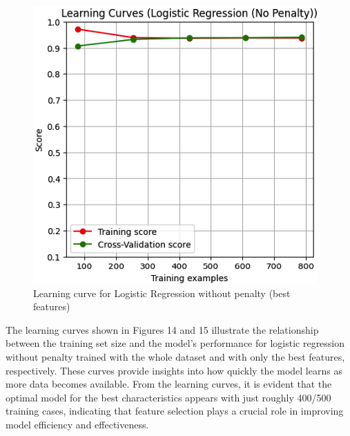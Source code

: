 \documentclass[conference]{IEEEtran}
\begin{document}
\begin{figure}[H]
    \centering
    \includegraphics[width=1\linewidth]{images/LearningCurveNoPenaltyBestFeatures.png}
    \caption{Learning curve for Logistic Regression without penalty (best features)}
    \label{fig:learning-curve-best}
\end{figure}


The learning curves shown in Figures 14 and 15 illustrate the relationship between the training set size and the model's performance for logistic regression without penalty trained with the whole dataset and with only the best features, respectively. These curves provide insights into how quickly the model learns as more data becomes available. From the learning curves, it is evident that the optimal model for the best characteristics appears with just roughly 400/500 training cases, indicating that feature selection plays a crucial role in improving model efficiency and effectiveness.
\end{document}
